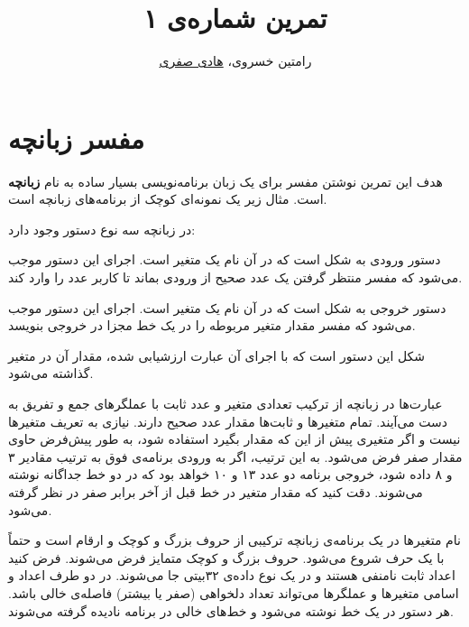\documentclass{utap}
\title{تمرین شماره‌ی ۱}
\author{رامتین خسروی، \href{mailto:hadi.safari@ut.ac.ir?subject=[AP\%20S98 A1]\%20}{هادی صفری}}
\begin{document}
	\maketitle
	
	\section{مفسر زبانچه}
	
	هدف این تمرین نوشتن مفسر برای یک زبان برنامه‌نویسی بسیار ساده به نام \textbf{زبانچه} است. مثال زیر یک نمونه‌ای کوچک از برنامه‌های زبانچه است.
	
	\begin{latin}
		
	\end{latin}
	
	در زبانچه سه نوع دستور وجود دارد:
	
	\begin{description}[leftmargin=6em,style=nextline,font=\labelitemi\quad\bfseries]
		\item[ورودی]
		دستور ورودی به شکل  است که در آن  نام یک متغیر است. اجرای این دستور موجب می‌شود که مفسر منتظر گرفتن یک عدد صحیح از ورودی بماند تا کاربر عدد را وارد کند.
		\item[خروجی]
		دستور خروجی به شکل  است که در آن  نام یک متغیر است. اجرای این دستور موجب می‌شود که مفسر مقدار متغیر مربوطه را در یک خط مجزا در خروجی بنویسد.
		\item[جایگزینی]
		شکل این دستور  است که با اجرای آن عبارت  ارزشیابی شده، مقدار آن در متغیر  گذاشته می‌شود.
	\end{description}
	
	عبارت‌ها در زبانچه از ترکیب تعدادی متغیر و عدد ثابت با عملگرهای جمع و تفریق به دست می‌آیند. تمام متغیرها و ثابت‌ها مقدار عدد صحیح دارند. نیازی به تعریف متغیرها نیست و اگر متغیری پیش از این که مقدار بگیرد استفاده شود، به طور پیش‌فرض حاوی مقدار صفر فرض می‌شود. به این ترتیب، اگر به ورودی برنامه‌ی فوق به ترتیب مقادیر ۳ و ۸ داده شود، خروجی برنامه دو عدد ۱۳ و ۱۰ خواهد بود که در دو خط جداگانه نوشته می‌شوند. دقت کنید که مقدار متغیر  در خط قبل از آخر برابر صفر در نظر گرفته می‌شود.
	
	نام متغیرها در یک برنامه‌ی زبانچه ترکیبی از حروف بزرگ و کوچک و ارقام است و حتماً با یک حرف شروع می‌شود. حروف بزرگ و کوچک متمایز فرض می‌شوند. فرض کنید اعداد ثابت نامنفی هستند و در یک نوع داده‌ی ۳۲‌بیتی جا می‌شوند. در دو طرف اعداد و اسامی متغیرها و عملگرها می‌تواند تعداد دلخواهی (صفر یا بیشتر) فاصله‌ی خالی باشد. هر دستور در یک خط نوشته می‌شود و خط‌های خالی در برنامه نادیده گرفته می‌شوند.
	
\end{document}
